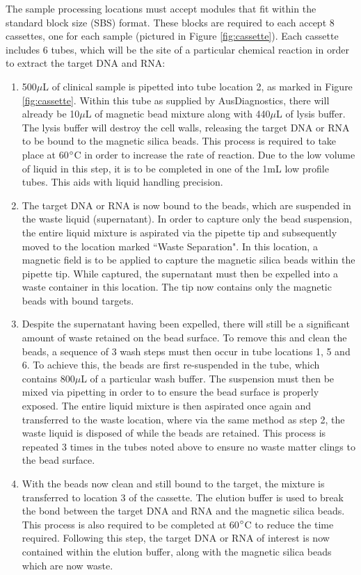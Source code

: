 The sample processing locations must accept modules that fit within the standard block size (SBS) format. These blocks are required to each accept 8 cassettes, one for each sample (pictured in Figure \ref{fig:cassette}). Each cassette includes 6 tubes, which will be the site of a particular chemical reaction in order to extract the target DNA and RNA:
\begin{enumerate}
	\item 500$\mu$L of clinical sample is pipetted into tube location 2, as marked in Figure \ref{fig:cassette}. Within this tube as supplied by AusDiagnostics, there will already be 10$\mu$L of magnetic bead mixture along with 440$\mu$L of lysis buffer. The lysis buffer will destroy the cell walls, releasing the target DNA or RNA to be bound to the magnetic silica beads. This process is required to take place at 60$\degree$C in order to increase the rate of reaction. Due to the low volume of liquid in this step, it is to be completed in one of the 1mL low profile tubes. This aids with liquid handling precision.
	\item The target DNA or RNA is now bound to the beads, which are suspended in the waste liquid (supernatant). In order to capture only the bead suspension, the entire liquid mixture is aspirated via the pipette tip and subsequently moved to the location marked ``Waste Separation". In this location, a magnetic field is to be applied to capture the magnetic silica beads within the pipette tip. While captured, the supernatant must then be expelled into a waste container in this location. The tip now contains only the magnetic beads with bound targets.
	\item Despite the supernatant having been expelled, there will still be a significant amount of waste retained on the bead surface. To remove this and clean the beads, a sequence of 3 wash steps must then occur in tube locations 1, 5 and 6. To achieve this, the beads are first re-suspended in the tube, which contains 800$\mu$L of a particular wash buffer. The suspension must then be mixed via pipetting in order to to ensure the bead surface is properly exposed. The entire liquid mixture is then aspirated once again and transferred to the waste location, where via the same method as step 2, the waste liquid is disposed of while the beads are retained. This process is repeated 3 times in the tubes noted above to ensure no waste matter clings to the bead surface.
	\item With the beads now clean and still bound to the target, the mixture is transferred to location 3 of the cassette. The elution buffer is used to break the bond between the target DNA and RNA and the magnetic silica beads. This process is also required to be completed at 60$\degree$C to reduce the time required. Following this step, the target DNA or RNA of interest is now contained within the elution buffer, along with the magnetic silica beads which are now waste.

\end{enumerate}
